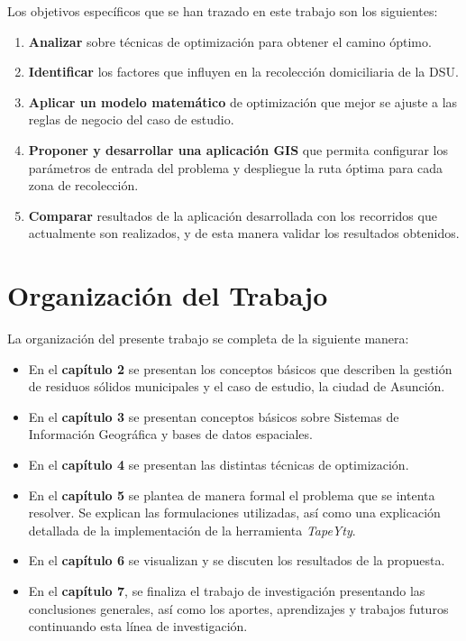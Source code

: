 Los objetivos específicos que se han trazado en este trabajo son los siguientes:

\begin{enumerate}
    \item \textbf{Analizar} sobre técnicas de optimización para obtener el camino óptimo. 
    \item \textbf{Identificar} los factores que influyen en la recolección domiciliaria de la DSU.
    \item \textbf{Aplicar un modelo matemático} de optimización que mejor se ajuste a las reglas de negocio del caso de estudio.
    \item \textbf{Proponer y desarrollar una aplicación GIS} que permita configurar los parámetros de entrada del problema y despliegue la ruta óptima para cada zona de recolección.
    \item \textbf{Comparar} resultados de la aplicación desarrollada con los recorridos que actualmente son realizados, y de esta manera validar los resultados obtenidos.
\end{enumerate}


\section{Organización del Trabajo}

La organización del presente trabajo se completa de la siguiente manera:

\begin{itemize}
    \item En el \textbf{capítulo 2} se presentan los conceptos básicos que describen la gestión de residuos sólidos municipales y el caso de estudio, la ciudad de Asunción.
    \item En el \textbf{capítulo 3} se presentan conceptos básicos sobre Sistemas de Información Geográfica y bases de datos espaciales.
    \item En el \textbf{capítulo 4} se presentan las distintas técnicas de optimización.    
    \item En el \textbf{capítulo 5} se plantea de manera formal el problema que se intenta resolver. Se explican las formulaciones utilizadas, así como una explicación detallada de la implementación de la herramienta \textit{TapeYty}. 
    \item En el \textbf{capítulo 6} se visualizan y se discuten los resultados de la propuesta.
    \item En el \textbf{capítulo 7}, se finaliza el trabajo de investigación presentando las conclusiones generales, así como los aportes, aprendizajes y trabajos futuros continuando esta línea de investigación.
\end{itemize}